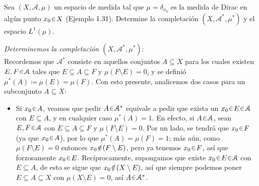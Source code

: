 \setcounter{neje}{65}
\begin{nejer}
Sea $(X, \mathcal{A}, \mu)$ un espacio de medida tal que $\mu = \delta_{x_0}$ es la medida de Dirac en algún punto $x_0 \en X$ (Ejemplo 1.31). Determine la completación $(X, \mathcal{A}^*, \mu^*)$ y el espacio $L^1(\mu)$.
\end{nejer}
\begin{sol}
\emph{Determinemos la completación $(X,\mathcal A^*,\mu^*)$}:\\
Recordemos que $\mathcal A^*$ consiste en aquellos conjuntos $A\subseteq X$ para los cuales existen $E,F\en\mathcal A$ tales que $E\subseteq A\subseteq F$ y $\mu(F\setminus E)=0$, y se definió $\mu^*(A) \coloneq \mu(E) = \mu(F)$. Con esto presente, analicemos dos casos para un subconjunto $A \subseteq X$:
\begin{itemize}
\item Si $x_0 \en A$, veamos que pedir $A\en\mathcal{A}^*$ equivale a pedir que exista un $x_0 \en E \en\mathcal{A}$ con $E \subseteq A$, y en cualquier caso $\mu^*(A) = 1$. En efecto, si $A\en\mathcal{A}$, sean $E,F\en\mathcal A$ con $E\subseteq A\subseteq F$ y $\mu(F\setminus E)=0$. Por un lado, se tendrá que $x_0\en F$ (ya que $x_0\en A$), por lo que $\mu^*(A) = \mu(F) = 1$; más aún, como $\mu(F\setminus E) = 0$ entonces $x_0 \noten (F \setminus E)$, pero ya tenemos $x_0\en F$, así que forzosamente $x_0 \en E$.
Recíprocamente, supongamos que existe $x_0 \en E \en\mathcal{A}$ con $E \subseteq A$, de esto se sigue que $x_0  \noten (X\setminus E)$, así que siempre podemos poner $E \subseteq A \subseteq X$ con $\mu(X \setminus E) = 0$, así $A\en\mathcal{A}^*$. 


\end{itemize}
\end{sol}
